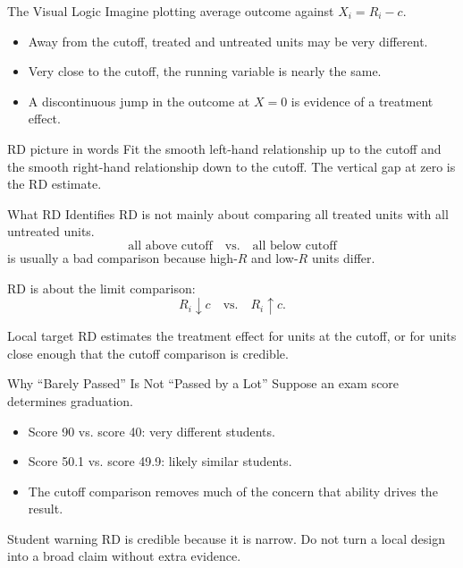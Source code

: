 \documentclass[11pt,aspectratio=169]{beamer}
\begin{document}
\begin{frame}{The Visual Logic}
  Imagine plotting average outcome against \(X_i=R_i-c\).
  \begin{itemize}
    \item Away from the cutoff, treated and untreated units may be very different.
    \item Very close to the cutoff, the running variable is nearly the same.
    \item A discontinuous jump in the outcome at \(X=0\) is evidence of a treatment effect.
  \end{itemize}
  \begin{block}{RD picture in words}
    Fit the smooth left-hand relationship up to the cutoff and the smooth right-hand relationship down to the cutoff. The vertical gap at zero is the RD estimate.
  \end{block}
\end{frame}

\begin{frame}{What RD Identifies}
  RD is not mainly about comparing all treated units with all untreated units.
  \[
    \text{all above cutoff} \quad \text{vs.} \quad \text{all below cutoff}
  \]
  is usually a bad comparison because high-\(R\) and low-\(R\) units differ.
  \vspace{0.4em}

  RD is about the limit comparison:
  \[
    R_i \downarrow c
    \quad \text{vs.} \quad
    R_i \uparrow c.
  \]
  \begin{block}{Local target}
    RD estimates the treatment effect for units at the cutoff, or for units close enough that the cutoff comparison is credible.
  \end{block}
\end{frame}

\begin{frame}{Why ``Barely Passed'' Is Not ``Passed by a Lot''}
  Suppose an exam score determines graduation.
  \begin{itemize}
    \item Score 90 vs. score 40: very different students.
    \item Score 50.1 vs. score 49.9: likely similar students.
    \item The cutoff comparison removes much of the concern that ability drives the result.
  \end{itemize}
  \begin{block}{Student warning}
    RD is credible because it is narrow. Do not turn a local design into a broad claim without extra evidence.
  \end{block}
\end{frame}
\end{document}
